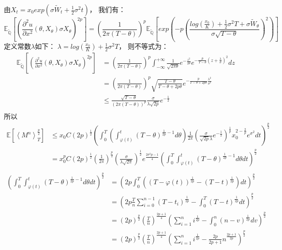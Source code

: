 由$X_t=x_0exp(\sigma \widetilde{W}_t+\frac{1}{2}\sigma^2t)$， 我们有：
\begin{equation}
\mathbb{E}_{\widetilde{\mathbb{Q}}}[ (\frac{\partial^2 u}{\partial x^2}(\theta, X_\theta)\sigma X_\theta)^{2p}]
=(\frac{1}{2\pi(T-\theta)})^p\mathbb{E}_{\widetilde{\mathbb{Q}}}[exp(-p(\frac{log(\frac{x_0}{K})+\frac{1}{2}\sigma^2T+\sigma\widetilde{W}_{\theta}}{\sigma\sqrt{T-\theta}})^2)]
\end{equation}
定义常数$\lambda$如下： $\lambda=log(\frac{x_0}{K})+\frac{1}{2}\sigma^2T$， 则不等式为：
\begin{equation}
\begin{split}
\mathbb{E}_{\widetilde{\mathbb{Q}}}[ (\frac{\partial^2 u}{\partial x^2}(\theta, X_\theta)\sigma X_\theta)^{2p}]
&=(\frac{1}{2\pi(T-\theta)})^p\int^{+\infty}_{-\infty}\frac{1}{\sqrt{2\pi\theta}}e^{-\frac{z^2}{2\theta}}e^{-\frac{p}{T-\theta}(z+\frac{\lambda}{\sigma})^2}dz\\
&=(\frac{1}{2\pi(T-\theta)})^p\sqrt{\frac{T-\theta}{T-\theta+2p\theta}}e^{-\frac{p}{T-\theta+2p\theta}\frac{\lambda^2}{\sigma^2}}\\
&\leq \frac{\sqrt{T-\theta}}{(2\pi(T-\theta))^p}\frac{\sigma}{\lambda\sqrt{2p}}e^{-\frac{1}{2}}\\
\end{split}
\end{equation}
所以 
\begin{equation}
\begin{split}
\mathbb{E}[\left \langle M^n \right \rangle_T^{\frac{p}{2}}]&\leq
 x_0C(2p)^{\frac{1}{2}}(\int_0^T(\int_{\varphi(t)}^t (T-\theta)^{\frac{1}{2p}-1} d\theta)\frac{1}{2\pi}(\frac{\sigma}{\sqrt{2p}\lambda}e^{-\frac{1}{2}})^{\frac{1}{p}}x_0^{2-\frac{2}{p}}e^{\sigma^2}dt)^{\frac{p}{2}}\\
 &=x_0^pC(2p)^{\frac{1}{2}}(\frac{1}{2\pi})^{\frac{p}{2}}(\frac{\sigma}{\lambda\sqrt{2\pi}})^{\frac{1}{2}}e^{\frac{2\sigma^2p-1}{4}}
 (\int_0^T\int_{\varphi(t)}^t (T-\theta)^{\frac{1}{2p}-1} d\theta dt)^{\frac{p}{2}}\\
 \end{split}
 \end{equation}
 \begin{equation}
 \begin{split}
 (\int_0^T\int_{\varphi(t)}^t (T-\theta)^{\frac{1}{2p}-1} d\theta dt)^{\frac{p}{2}}
 &=(2p\int_0^T((T-\varphi(t))^{\frac{1}{2p}}-(T-t)^{\frac{1}{2p}}) dt)^{\frac{p}{2}}\\
 &=(2p\frac{T}{n}\sum_{i=0}^{n-1}(T-t_i)^{\frac{1}{2p}}-\int_0^T(T-t)^{\frac{1}{2p}} dt)^{\frac{p}{2}}\\
 &=(2p)^{\frac{p}{2}}(\frac{T}{n})^{\frac{2p+1}{4}}(\sum_{i=1}^{n}i^{\frac{1}{2p}}-\int_0^n(n-v)^{\frac{1}{2p}} dv)^{\frac{p}{2}}\\
 &=(2p)^{\frac{p}{2}}(\frac{T}{n})^{\frac{2p+1}{4}}(\sum_{i=1}^{n}i^{\frac{1}{2p}}-\frac{2p}{2p+1}n^{\frac{2p+1}{2p}})^{\frac{p}{2}}\\
 \end{split}
 \end{equation}
